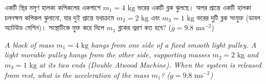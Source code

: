 \documentclass[12pt, a4paper]{article}
\begin{document}
\begin{tcolorbox}[questionbox={প্রশ্ন (Question) 41}]
\noindent
একটি স্থির মসৃণ হালকা কপিকলের একপাশে $m_1 = 4\text{ kg}$ ভরের একটি ব্লক ঝুলছে। অপর প্রান্তে একটি হালকা চলনক্ষম কপিকল ঝুলানো, যার দুই প্রান্তে যথাক্রমে $m_2 = 2\text{ kg}$ এবং $m_3 = 1\text{ kg}$ ভরের দুটি ব্লক সংযুক্ত (ডাবল অ্যাটউড মেশিন)। সংস্থাটিকে মুক্ত করে দিলে $m_1$ ব্লকের ত্বরণ কত হবে? ($g = 9.8\text{ ms}^{-2}$)

\vspace{0.8em}
\begin{english}
\noindent\textit{\color{darkgray}
A block of mass $m_1 = 4\text{ kg}$ hangs from one side of a fixed smooth light pulley. A light movable pulley hangs from the other side, supporting masses $m_2 = 2\text{ kg}$ and $m_3 = 1\text{ kg}$ at its two ends (Double Atwood Machine). When the system is released from rest, what is the acceleration of the mass $m_1$? ($g = 9.8\text{ ms}^{-2}$)
}
\end{english}
\end{tcolorbox}
\end{document}
